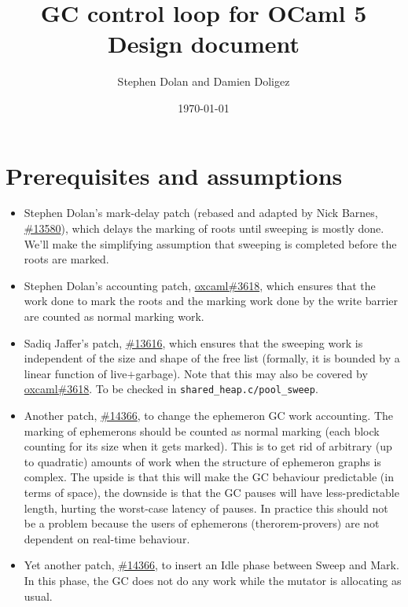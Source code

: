 \documentclass{article}
\begin{document}
\title{GC control loop for OCaml 5\\
Design document}
\author{Stephen Dolan and Damien Doligez}
\date{\today}


\maketitle

\section{Prerequisites and assumptions}
\label{prerequisites}

\begin{itemize}
\item[\Checkmark] Stephen Dolan's mark-delay patch (rebased and adapted by Nick
Barnes, \href{https://github.com/ocaml/ocaml/pull/13580}{\#13580}),
which delays the marking of roots until sweeping is mostly done. We'll
make the simplifying assumption that sweeping is completed before the
roots are marked.
\item[\Checkmark] Stephen Dolan's accounting patch,
\href{https://github.com/oxcaml/oxcaml/pull/3618}{oxcaml\#3618}, which
ensures that the work done to mark the roots and the marking work done by the
write barrier are counted as normal marking work.
\item[\Checkmark] Sadiq Jaffer's patch,
\href{https://github.com/ocaml/ocaml/pull/13616}{\#13616}, which ensures that
the sweeping work is independent of the size and shape of the free
list (formally, it is bounded by a linear function of
live$+$garbage). Note that this may also be covered by
\href{https://github.com/oxcaml/oxcaml/pull/3618}{oxcaml\#3618}. To
be checked in \verb'shared_heap.c/pool_sweep'.
\item[\Checkmark] Another patch,
\href{https://github.com/ocaml/ocaml/pull/14366}{\#14366},
to change the ephemeron GC work accounting. The
marking of ephemerons should be counted as normal marking (each block
counting for its size when it gets marked). This is to get rid of
arbitrary (up to quadratic) amounts of work when the structure of
ephemeron graphs is complex. The upside is that this will make the GC
behaviour predictable (in terms of space), the downside is that the GC
pauses will have less-predictable length, hurting the worst-case
latency of pauses. In practice this should not be a problem because
the users of ephemerons (therorem-provers) are not dependent on
real-time behaviour.
\item[\Checkmark] Yet another patch,
\href{https://github.com/ocaml/ocaml/pull/14366}{\#14366},
to insert an Idle phase between Sweep and
Mark. In this phase, the GC does not do any work while the mutator is
allocating as usual.
\end{itemize}
\end{document}
